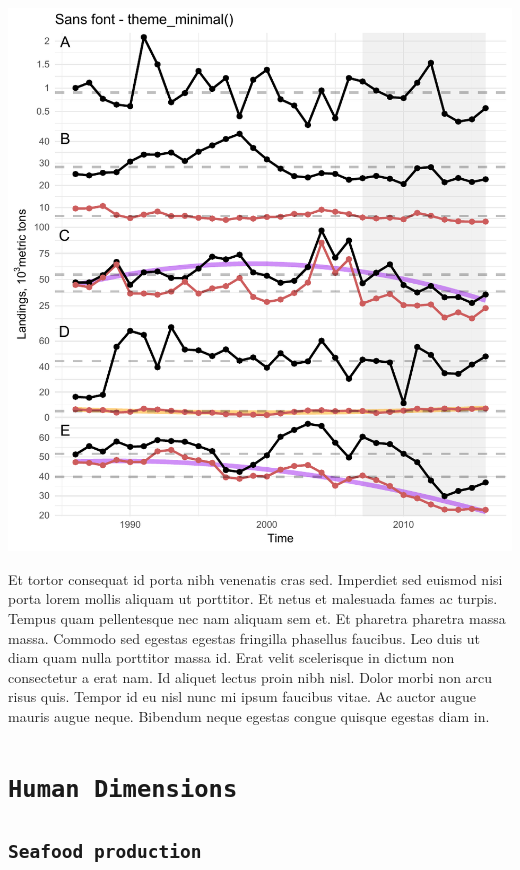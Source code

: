 \documentclass[11pt,]{article}
\begin{document}
\includegraphics{font_test_files/figure-latex/unnamed-chunk-1-1.pdf}

Et tortor consequat id porta nibh venenatis cras sed. Imperdiet sed
euismod nisi porta lorem mollis aliquam ut porttitor. Et netus et
malesuada fames ac turpis. Tempus quam pellentesque nec nam aliquam sem
et. Et pharetra pharetra massa massa. Commodo sed egestas egestas
fringilla phasellus faucibus. Leo duis ut diam quam nulla porttitor
massa id. Erat velit scelerisque in dictum non consectetur a erat nam.
Id aliquet lectus proin nibh nisl. Dolor morbi non arcu risus quis.
Tempor id eu nisl nunc mi ipsum faucibus vitae. Ac auctor augue mauris
augue neque. Bibendum neque egestas congue quisque egestas diam in.

\hypertarget{human-dimensions}{%
\section{\texorpdfstring{\texttt{Human\ Dimensions}}{Human Dimensions}}\label{human-dimensions}}

\hypertarget{seafood-production}{%
\subsection{\texorpdfstring{\texttt{Seafood\ production}}{Seafood production}}\label{seafood-production}}
\end{document}

